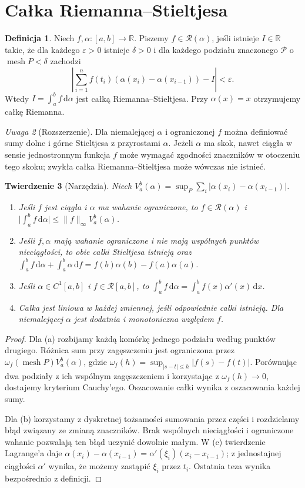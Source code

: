 \documentclass[11pt,a4paper]{article}
\numberwithin{equation}{section}
\theoremstyle{plain}
\newtheorem{twierdzenie}{Twierdzenie}[section]
\theoremstyle{definition}
\newtheorem{definicja}[twierdzenie]{Definicja}
\theoremstyle{remark}
\newtheorem{uwaga}[twierdzenie]{Uwaga}
\newcommand{\R}{\mathbb R}
\newcommand{\mesh}{\operatorname{mesh}}
\begin{document}
\section{Całka Riemanna--Stieltjesa}
\begin{definicja}
Niech $f,\alpha:[a,b]\to\R$. Piszemy $f\in\mathcal R(\alpha)$, jeśli istnieje $I\in\R$ takie, że dla każdego $\varepsilon>0$ istnieje $\delta>0$ i dla każdego podziału znaczonego $\mathcal P$ o $\mesh P<\delta$ zachodzi
\[
\left|\sum_{i=1}^n f(t_i)(\alpha(x_i)-\alpha(x_{i-1}))-I\right|<\varepsilon.
\]
Wtedy $I=\int_a^b f\,\mathrm d\alpha$ jest całką Riemanna--Stieltjesa. Przy $\alpha(x)=x$ otrzymujemy całkę Riemanna.
\end{definicja}
\begin{uwaga}[Rozszerzenie]
Dla niemalejącej $\alpha$ i ograniczonej $f$ można definiować sumy dolne i górne Stieltjesa z przyrostami $\alpha$. Jeżeli $\alpha$ ma skok, nawet ciągła w sensie jednostronnym funkcja $f$ może wymagać zgodności znaczników w otoczeniu tego skoku; zwykła całka Riemanna--Stieltjesa może wówczas nie istnieć.
\end{uwaga}
\begin{twierdzenie}[Narzędzia]
Niech $V_a^b(\alpha)=\sup_P\sum_i|\alpha(x_i)-\alpha(x_{i-1})|$.
\begin{enumerate}[label=(\alph*)]
\item Jeśli $f$ jest ciągła i $\alpha$ ma wahanie ograniczone, to $f\in\mathcal R(\alpha)$ i $\bigl|\int_a^b f\,\mathrm d\alpha\bigr|\le\|f\|_\infty V_a^b(\alpha)$.
\item Jeśli $f,\alpha$ mają wahanie ograniczone i nie mają wspólnych punktów nieciągłości, to obie całki Stieltjesa istnieją oraz
$\int_a^b f\,\mathrm d\alpha+\int_a^b\alpha\,\mathrm df=f(b)\alpha(b)-f(a)\alpha(a)$.
\item Jeśli $\alpha\in C^1[a,b]$ i $f\in\mathcal R[a,b]$, to $\int_a^b f\,\mathrm d\alpha=\int_a^b f(x)\alpha'(x)\,\mathrm dx$.
\item Całka jest liniowa w każdej zmiennej, jeśli odpowiednie całki istnieją. Dla niemalejącej $\alpha$ jest dodatnia i monotoniczna względem $f$.
\end{enumerate}
\end{twierdzenie}
\begin{proof}
Dla (a) rozbijamy każdą komórkę jednego podziału według punktów drugiego. Różnica sum przy zagęszczeniu jest ograniczona przez $\omega_f(\mesh P)V_a^b(\alpha)$, gdzie $\omega_f(h)=\sup_{|s-t|\le h}|f(s)-f(t)|$. Porównując dwa podziały z ich wspólnym zagęszczeniem i korzystając z $\omega_f(h)\to0$, dostajemy kryterium Cauchy'ego. Oszacowanie całki wynika z oszacowania każdej sumy.

Dla (b) korzystamy z dyskretnej tożsamości sumowania przez części i rozdzielamy błąd związany ze zmianą znaczników. Brak wspólnych nieciągłości i ograniczone wahanie pozwalają ten błąd uczynić dowolnie małym. W (c) twierdzenie Lagrange'a daje $\alpha(x_i)-\alpha(x_{i-1})=\alpha'(\xi_i)(x_i-x_{i-1})$; z jednostajnej ciągłości $\alpha'$ wynika, że możemy zastąpić $\xi_i$ przez $t_i$. Ostatnia teza wynika bezpośrednio z definicji.
\end{proof}
\end{document}
